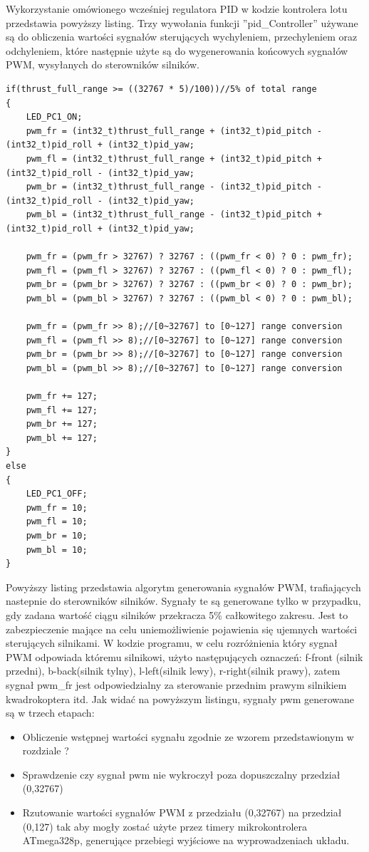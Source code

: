 Wykorzystanie omówionego wcześniej regulatora PID w kodzie kontrolera lotu przedstawia powyższy listing. Trzy wywołania funkcji ''pid\_Controller'' używane są do obliczenia wartości sygnałów sterujących wychyleniem, przechyleniem oraz odchyleniem, które następnie użyte są do wygenerowania końcowych sygnałów PWM, wysyłanych do sterowników silników. 

\begin{lstlisting}
if(thrust_full_range >= ((32767 * 5)/100))//5% of total range
{
	LED_PC1_ON;
	pwm_fr = (int32_t)thrust_full_range + (int32_t)pid_pitch - (int32_t)pid_roll + (int32_t)pid_yaw;
	pwm_fl = (int32_t)thrust_full_range + (int32_t)pid_pitch + (int32_t)pid_roll - (int32_t)pid_yaw;
	pwm_br = (int32_t)thrust_full_range - (int32_t)pid_pitch - (int32_t)pid_roll - (int32_t)pid_yaw;
	pwm_bl = (int32_t)thrust_full_range - (int32_t)pid_pitch + (int32_t)pid_roll + (int32_t)pid_yaw;

	pwm_fr = (pwm_fr > 32767) ? 32767 : ((pwm_fr < 0) ? 0 : pwm_fr); 
	pwm_fl = (pwm_fl > 32767) ? 32767 : ((pwm_fl < 0) ? 0 : pwm_fl); 
	pwm_br = (pwm_br > 32767) ? 32767 : ((pwm_br < 0) ? 0 : pwm_br);
	pwm_bl = (pwm_bl > 32767) ? 32767 : ((pwm_bl < 0) ? 0 : pwm_bl);

	pwm_fr = (pwm_fr >> 8);//[0~32767] to [0~127] range conversion
	pwm_fl = (pwm_fl >> 8);//[0~32767] to [0~127] range conversion
	pwm_br = (pwm_br >> 8);//[0~32767] to [0~127] range conversion
	pwm_bl = (pwm_bl >> 8);//[0~32767] to [0~127] range conversion

	pwm_fr += 127;
	pwm_fl += 127;
	pwm_br += 127;
	pwm_bl += 127;
}
else
{
	LED_PC1_OFF;
	pwm_fr = 10;
	pwm_fl = 10;
	pwm_br = 10;
	pwm_bl = 10;
}
\end{lstlisting}

Powyższy listing przedstawia algorytm generowania sygnałów PWM, trafiających nastepnie do sterowników silników. Sygnały te są generowane tylko w przypadku, gdy zadana wartość ciągu silników przekracza 5\% całkowitego zakresu. Jest to zabezpieczenie mające na celu uniemożliwienie pojawienia się ujemnych wartości sterujących silnikami. W kodzie programu, w celu rozróżnienia który sygnał PWM odpowiada któremu silnikowi, użyto następujących oznaczeń: f-front (silnik przedni), b-back(silnik tylny), l-left(silnik lewy), r-right(silnik prawy), zatem sygnał pwm\_fr jest odpowiedzialny za sterowanie przednim prawym silnikiem kwadrokoptera itd. Jak widać na powyższym listingu, sygnały pwm generowane są w trzech etapach:
\begin{itemize}
	\item Obliczenie wstępnej wartości sygnału zgodnie ze wzorem przedstawionym w rozdziale ?
	\item Sprawdzenie czy sygnał pwm nie wykroczył poza dopuszczalny przedział (0,32767)
	\item Rzutowanie wartości sygnałów PWM z przedziału (0,32767) na przedział (0,127) tak aby mogły zostać użyte przez timery mikrokontrolera ATmega328p, generujące przebiegi wyjściowe na wyprowadzeniach układu. 
\end{itemize}


